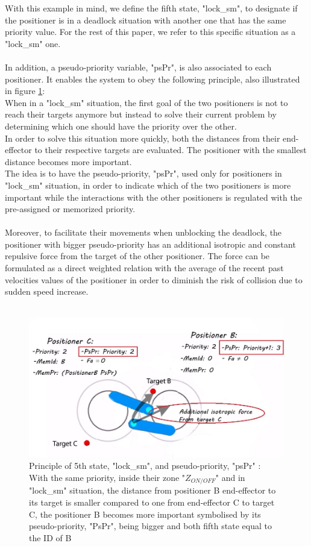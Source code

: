 \documentclass[]{spie}  %
\begin{document}
	
	With this example in mind, we define the fifth state, "lock\_sm", to designate if the positioner is in a deadlock situation with another one that has the same priority value. For the rest of this paper, we refer to this specific situation as a "lock\_sm" one. \\\\
	In addition, a pseudo-priority variable, "psPr", is also associated to each positioner. It enables the system to obey the following principle, also illustrated in figure \ref{5thState}:\\
	When in a "lock\_sm" situation, the first goal of the two positioners is not to reach their targets anymore but instead to solve their current problem by determining which one should have the priority over the other. \\
	 In order to solve this situation more quickly, both the distances from their end-effector to their respective targets are evaluated. The positioner with the smallest distance becomes more important. \\
	 The idea is to have the pseudo-priority, "psPr", used only for positioners in "lock\_sm" situation, in order to indicate which of the two positioners is more important while the interactions with the other positioners is regulated with the pre-assigned or memorized priority. \\\\
	Moreover, to facilitate their movements when unblocking the deadlock, the positioner with bigger pseudo-priority has an additional isotropic and constant repulsive force from the target of the other positioner. The force can be formulated as a direct weighted relation with the average of the recent past velocities values of the positioner in order to diminish the risk of collision due to sudden speed increase.\\\\
	
	\begin{figure}[H]
		\centering
		\includegraphics[scale=0.4]{images/5thstate.jpg}
		\caption{\centering Principle of 5th state, "lock\_sm", and pseudo-priority, "psPr" :\\
		With the same priority, inside their zone "$Z_{ON/OFF}$" and in "lock\_sm" situation, the distance from positioner B end-effector to its target is smaller compared to one from end-effector C to target C, the positioner B becomes more important symbolised by its pseudo-priority, "PsPr", being bigger and both fifth state equal to the ID of B}
		\label{5thState}
	\end{figure}
	
\end{document}

